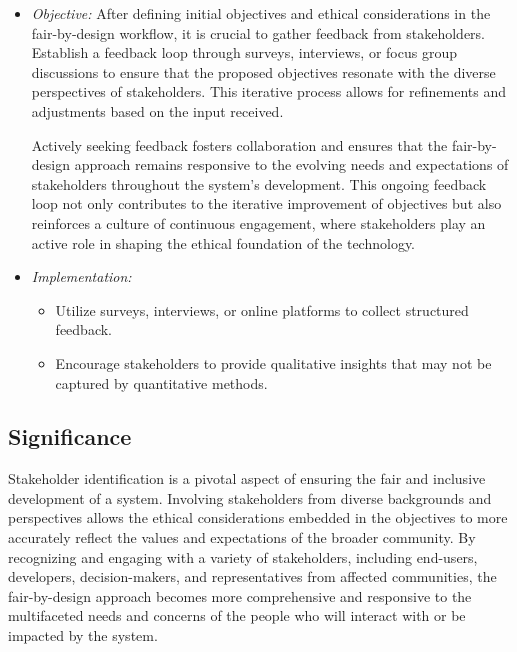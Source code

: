 \documentclass[12pt,a4paper,openright,twoside]{book}
\begin{document}
\begin{itemize}

    \item \emph{Objective:} After defining initial objectives and ethical considerations in the fair-by-design workflow, it is crucial to gather feedback from stakeholders. Establish a feedback loop through surveys, interviews, or focus group discussions to ensure that the proposed objectives resonate with the diverse perspectives of stakeholders. This iterative process allows for refinements and adjustments based on the input received.

    Actively seeking feedback fosters collaboration and ensures that the fair-by-design approach remains responsive to the evolving needs and expectations of stakeholders throughout the system's development. This ongoing feedback loop not only contributes to the iterative improvement of objectives but also reinforces a culture of continuous engagement, where stakeholders play an active role in shaping the ethical foundation of the technology.

    \item \emph{Implementation:}

    \begin{itemize}

        \item Utilize surveys, interviews, or online platforms to collect structured feedback.

        \item Encourage stakeholders to provide qualitative insights that may not be captured by quantitative methods.

    \end{itemize}

\end{itemize}

\subsection{Significance}

Stakeholder identification is a pivotal aspect of ensuring the fair and inclusive development of a system. Involving stakeholders from diverse backgrounds and perspectives allows the ethical considerations embedded in the objectives to more accurately reflect the values and expectations of the broader community. By recognizing and engaging with a variety of stakeholders, including end-users, developers, decision-makers, and representatives from affected communities, the fair-by-design approach becomes more comprehensive and responsive to the multifaceted needs and concerns of the people who will interact with or be impacted by the system.
\end{document}
